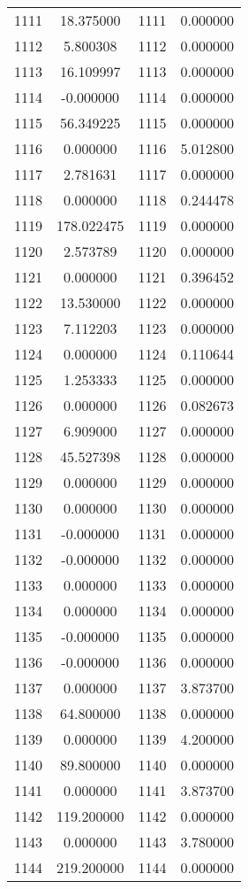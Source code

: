 \documentclass[12pt]{article}
\begin{document}
\begin{longtable}{@{}cccc@{}}
1111 & 18.375000 & 1111 & 0.000000 \\
1112 & 5.800308 & 1112 & 0.000000 \\
1113 & 16.109997 & 1113 & 0.000000 \\
1114 & -0.000000 & 1114 & 0.000000 \\
1115 & 56.349225 & 1115 & 0.000000 \\
1116 & 0.000000 & 1116 & 5.012800 \\
1117 & 2.781631 & 1117 & 0.000000 \\
1118 & 0.000000 & 1118 & 0.244478 \\
1119 & 178.022475 & 1119 & 0.000000 \\
1120 & 2.573789 & 1120 & 0.000000 \\
1121 & 0.000000 & 1121 & 0.396452 \\
1122 & 13.530000 & 1122 & 0.000000 \\
1123 & 7.112203 & 1123 & 0.000000 \\
1124 & 0.000000 & 1124 & 0.110644 \\
1125 & 1.253333 & 1125 & 0.000000 \\
1126 & 0.000000 & 1126 & 0.082673 \\
1127 & 6.909000 & 1127 & 0.000000 \\
1128 & 45.527398 & 1128 & 0.000000 \\
1129 & 0.000000 & 1129 & 0.000000 \\
1130 & 0.000000 & 1130 & 0.000000 \\
1131 & -0.000000 & 1131 & 0.000000 \\
1132 & -0.000000 & 1132 & 0.000000 \\
1133 & 0.000000 & 1133 & 0.000000 \\
1134 & 0.000000 & 1134 & 0.000000 \\
1135 & -0.000000 & 1135 & 0.000000 \\
1136 & -0.000000 & 1136 & 0.000000 \\
1137 & 0.000000 & 1137 & 3.873700 \\
1138 & 64.800000 & 1138 & 0.000000 \\
1139 & 0.000000 & 1139 & 4.200000 \\
1140 & 89.800000 & 1140 & 0.000000 \\
1141 & 0.000000 & 1141 & 3.873700 \\
1142 & 119.200000 & 1142 & 0.000000 \\
1143 & 0.000000 & 1143 & 3.780000 \\
1144 & 219.200000 & 1144 & 0.000000 \\

\end{longtable}
\end{document}
